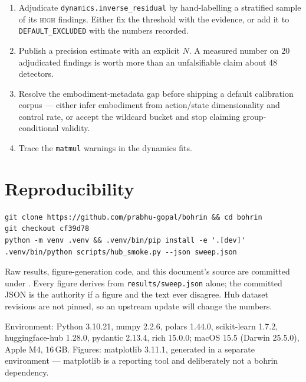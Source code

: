 \documentclass[10pt,a4paper]{article}
\newcommand{\dtr}[1]{\texttt{\small #1}}
\begin{document}
\begin{enumerate}\itemsep2pt
\item Adjudicate \dtr{dynamics.inverse\_residual} by hand-labelling a stratified sample of
its \textsc{high} findings. Either fix the threshold with the evidence, or add it to
\texttt{DEFAULT\_EXCLUDED} with the numbers recorded.
\item Publish a precision estimate with an explicit $N$. A measured number on 20
adjudicated findings is worth more than an unfalsifiable claim about 48 detectors.
\item Resolve the embodiment-metadata gap before shipping a default calibration corpus ---
either infer embodiment from action/state dimensionality and control rate, or accept the
wildcard bucket and stop claiming group-conditional validity.
\item Trace the \texttt{matmul} warnings in the dynamics fits.
\end{enumerate}

\section*{Reproducibility}

\begin{verbatim}
git clone https://github.com/prabhu-gopal/bohrin && cd bohrin
git checkout cf39d78
python -m venv .venv && .venv/bin/pip install -e '.[dev]'
.venv/bin/python scripts/hub_smoke.py --json sweep.json
\end{verbatim}

Raw results, figure-generation code, and this document's source are committed under
. Every figure derives from
\texttt{results/sweep.json} alone; the committed JSON is the authority if a figure and the
text ever disagree. Hub dataset revisions are not pinned, so an upstream update will change
the numbers.

\vspace{0.6em}
\noindent\textcolor{ink}{\footnotesize Environment: Python 3.10.21, numpy 2.2.6,
polars 1.44.0, scikit-learn 1.7.2, huggingface-hub 1.28.0, pydantic 2.13.4, rich 15.0.0;
macOS 15.5 (Darwin 25.5.0), Apple M4, 16\,GB. Figures: matplotlib 3.11.1, generated in a
separate environment --- matplotlib is a reporting tool and deliberately not a bohrin
dependency.}
\end{document}
